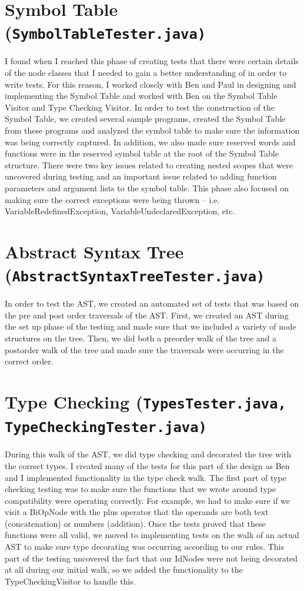 \documentclass{report}
\begin{document}
\section{Symbol Table (\tt SymbolTableTester.java\rm)}
I found when I reached this phase of creating tests that there were certain details of the node classes that I needed to gain a better understanding of in order to write tests. For this reason, I worked closely with Ben and Paul in designing and implementing the Symbol Table and worked with Ben on the Symbol Table Visitor and Type Checking Visitor. In order to test the construction of the Symbol Table, we created several sample programs, created the Symbol Table from these programs and analyzed the symbol table to make sure the information was being correctly captured. In addition, we also made sure reserved words and functions were in the reserved symbol table at the root of the Symbol Table structure. There were two key issues related to creating nested scopes that were uncovered during testing and an important issue related to adding function parameters and argument lists to the symbol table. This phase also focused on making sure the correct exceptions were being thrown – i.e. VariableRedefinedException, VariableUndeclaredException, etc.

\section{Abstract Syntax Tree (\tt AbstractSyntaxTreeTester.java\rm)}

In order to test the AST, we created an automated set of tests that was based on the pre and post order traversals of the AST. First, we created an AST during the set up phase of the testing and made sure that we included a variety of node structures on the tree. Then, we did both a preorder walk of the tree and a postorder walk of the tree and made sure the traversals were occurring in the correct order.  

\section{Type Checking (\tt TypesTester.java\rm, \tt  TypeCheckingTester.java\rm)}

During this walk of the AST, we did type checking and decorated the tree with the correct types. I created many of the tests for this part of the design as Ben and I implemented functionality in the type check walk. The first part of type checking testing was to make sure the functions that we wrote around type compatibility were operating correctly. For example, we had to make sure if we visit a BiOpNode with the plus operator that the operands are both text (concatenation) or numbers (addition). Once the tests proved that these functions were all valid, we moved to implementing tests on the walk of an actual AST to make sure type decorating was occurring according to our rules. This part of the testing uncovered the fact that our IdNodes were not being decorated at all during our initial walk, so we added the functionality to the TypeCheckingVisitor to handle this.  
\end{document}
